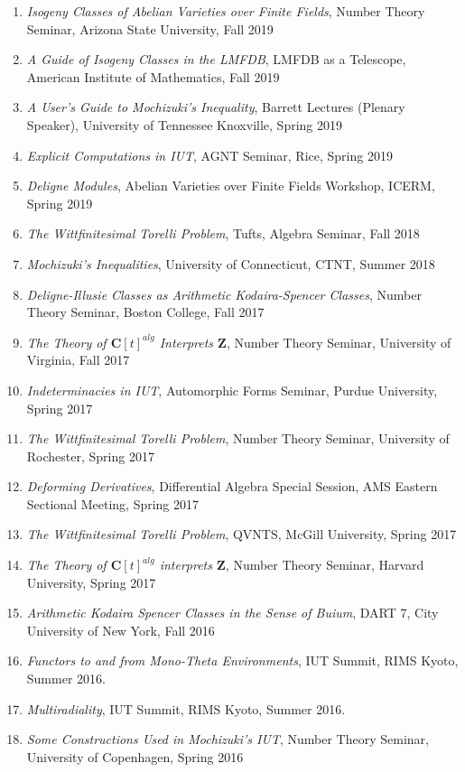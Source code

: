 \documentclass[a4paper,10pt]{article}
\newcommand{\CC}{\mathbf{C}}
\newcommand{\ZZ}{\mathbf{Z}}
\begin{document}
\begin{enumerate}
	\item \emph{Isogeny Classes of Abelian Varieties over Finite Fields}, Number Theory Seminar, Arizona State University, Fall 2019
	\item \emph{A Guide of Isogeny Classes in the LMFDB}, LMFDB as a Telescope, American Institute of Mathematics, Fall 2019
	\item \emph{A User's Guide to Mochizuki's Inequality}, Barrett Lectures (Plenary Speaker), University of Tennessee Knoxville, Spring 2019
	\item \emph{Explicit Computations in IUT}, AGNT Seminar, Rice, Spring 2019
	\item \emph{Deligne Modules}, Abelian Varieties over Finite Fields Workshop, ICERM, Spring 2019
	\item \emph{The Wittfinitesimal Torelli Problem}, Tufts, Algebra Seminar, Fall 2018
	\item \emph{Mochizuki's Inequalities}, University of Connecticut, CTNT, Summer 2018
	\item \emph{Deligne-Illusie Classes as Arithmetic Kodaira-Spencer Classes}, Number Theory Seminar, Boston College, Fall 2017
	\item \emph{The Theory of $\CC[t]^{alg}$ Interprets $\ZZ$}, Number Theory Seminar, University of Virginia, Fall 2017
	\item \emph{Indeterminacies in IUT}, Automorphic Forms Seminar, Purdue University, Spring 2017
	\item \emph{The Wittfinitesimal Torelli Problem}, Number Theory Seminar, University of Rochester, Spring 2017 
	\item \emph{Deforming Derivatives}, Differential Algebra Special Session, AMS Eastern Sectional Meeting, Spring 2017
	\item \emph{The Wittfinitesimal Torelli Problem}, QVNTS, McGill University, Spring 2017 
	\item \emph{The Theory of $\CC[t]^{alg}$ interprets $\ZZ$}, Number Theory Seminar, Harvard University, Spring 2017
	\item \emph{Arithmetic Kodaira Spencer Classes in the Sense of Buium}, DART 7, City University of New York, Fall 2016 
	\item \emph{Functors to and from Mono-Theta Environments}, IUT Summit, RIMS Kyoto, Summer 2016.
	\item \emph{Multiradiality},  IUT Summit, RIMS Kyoto, Summer 2016. 
	\item \emph{Some Constructions Used in Mochizuki's IUT},  Number Theory Seminar, University of Copenhagen,  Spring 2016

\end{enumerate}
\end{document}
